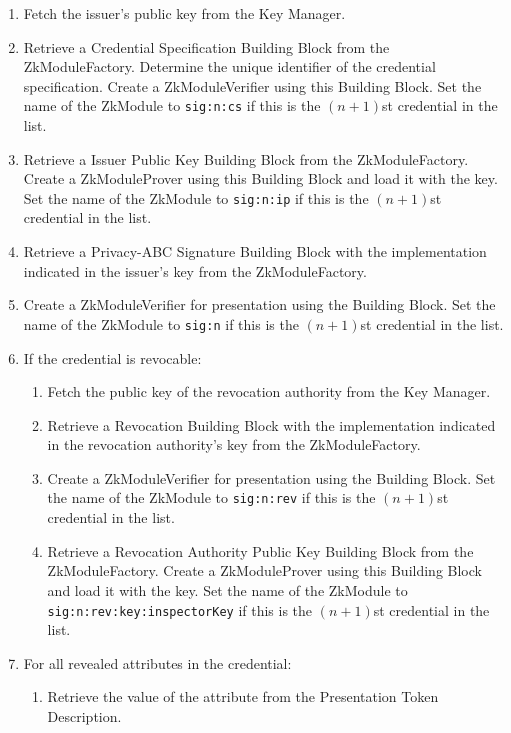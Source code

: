 \begin{enumerate}
\begin{enumerate}
          \item Fetch the issuer's public key from the Key Manager.
          \item Retrieve a Credential Specification Building Block from the ZkModuleFactory. Determine the unique identifier
            of the credential specification. Create a ZkModuleVerifier using this Building Block. Set the name of the ZkModule to
            \texttt{sig:n:cs} if this is the $(n+1)$st credential in the list.
          \item Retrieve a Issuer Public Key Building Block from the ZkModuleFactory.
            Create a ZkModuleProver using this Building Block and load it with the key. Set the name of the ZkModule to
            \texttt{sig:n:ip} if this is the $(n+1)$st credential in the list.
          \item Retrieve a Privacy-ABC Signature Building Block with the implementation indicated in the issuer's key from the ZkModuleFactory.
          \item Create a ZkModuleVerifier for presentation using the Building Block. Set the name of the ZkModule to
            \texttt{sig:n} if this is the $(n+1)$st credential in the list.
          \item If the credential is revocable:
            \begin{enumerate}
              \item Fetch the public key of the revocation authority from the Key Manager.
              \item Retrieve a Revocation Building Block with the implementation indicated in the revocation authority's key from the ZkModuleFactory.
              \item Create a ZkModuleVerifier for presentation using the Building Block. Set the name of the ZkModule to
                \texttt{sig:n:rev} if this is the $(n+1)$st credential in the list.
              \item Retrieve a Revocation Authority Public Key Building Block from the ZkModuleFactory.
                Create a ZkModuleProver using this Building Block and load it with the key. Set the name of the ZkModule to
                \texttt{sig:n:rev:key:inspectorKey} if this is the $(n+1)$st credential in the list.
            \end{enumerate}
          \item For all revealed attributes in the credential:
            \begin{enumerate}
              \item Retrieve the value of the attribute from the Presentation Token Description.

\end{enumerate}
\end{enumerate}
\end{enumerate}

